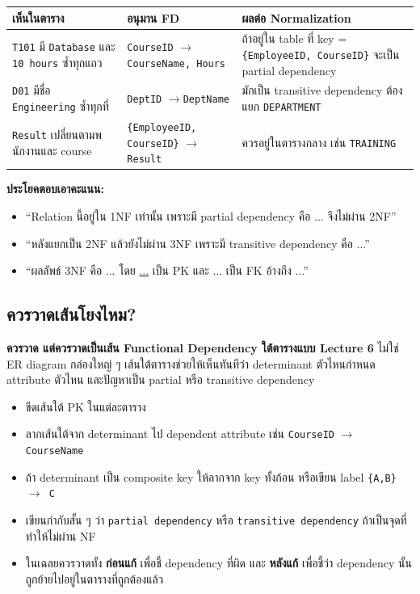 \documentclass[a4paper,12pt]{article}
\newcommand{\pk}[1]{\uline{#1}}
\newcommand{\fd}{\(\rightarrow\)}
\newcommand{\schema}[1]{\texttt{#1}}
\begin{document}
\begin{center}
\renewcommand{\arraystretch}{1.2}
\begin{tabular}{|p{4.0cm}|p{4.8cm}|p{5.0cm}|}
    \hline
    \rowcolor{gray!20}
    \textbf{เห็นในตาราง} & \textbf{อนุมาน FD} & \textbf{ผลต่อ Normalization} \\
    \hline
    \schema{T101} มี \schema{Database} และ \schema{10 hours} ซ้ำทุกแถว & \schema{CourseID} \fd \schema{CourseName, Hours} & ถ้าอยู่ใน table ที่ key = \schema{\{EmployeeID, CourseID\}} จะเป็น partial dependency \\
    \hline
    \schema{D01} มีชื่อ \schema{Engineering} ซ้ำทุกที่ & \schema{DeptID} \fd \schema{DeptName} & มักเป็น transitive dependency ต้องแยก \schema{DEPARTMENT} \\
    \hline
    \schema{Result} เปลี่ยนตามพนักงานและ course & \schema{\{EmployeeID, CourseID\}} \fd \schema{Result} & ควรอยู่ในตารางกลาง เช่น \schema{TRAINING} \\
    \hline
\end{tabular}
\end{center}

\noindent\textbf{ประโยคตอบเอาคะแนน:}
\begin{itemize}
    \item ``Relation นี้อยู่ใน 1NF เท่านั้น เพราะมี partial dependency คือ ... จึงไม่ผ่าน 2NF''
    \item ``หลังแยกเป็น 2NF แล้วยังไม่ผ่าน 3NF เพราะมี transitive dependency คือ ...''
    \item ``ผลลัพธ์ 3NF คือ ... โดย \pk{...} เป็น PK และ ... เป็น FK อ้างถึง ...''
\end{itemize}

\subsection*{ควรวาดเส้นโยงไหม?}
\textbf{ควรวาด แต่ควรวาดเป็นเส้น Functional Dependency ใต้ตารางแบบ Lecture 6} ไม่ใช่ ER diagram กล่องใหญ่ ๆ เส้นใต้ตารางช่วยให้เห็นทันทีว่า determinant ตัวไหนกำหนด attribute ตัวไหน และปัญหาเป็น partial หรือ transitive dependency
\begin{itemize}
    \item ขีดเส้นใต้ PK ในแต่ละตาราง
    \item ลากเส้นใต้จาก determinant ไป dependent attribute เช่น \schema{CourseID} $\rightarrow$ \schema{CourseName}
    \item ถ้า determinant เป็น composite key ให้ลากจาก key ทั้งก้อน หรือเขียน label \schema{\{A,B\} $\rightarrow$ C}
    \item เขียนกำกับสั้น ๆ ว่า \schema{partial dependency} หรือ \schema{transitive dependency} ถ้าเป็นจุดที่ทำให้ไม่ผ่าน NF
    \item ในเฉลยควรวาดทั้ง \textbf{ก่อนแก้} เพื่อชี้ dependency ที่ผิด และ \textbf{หลังแก้} เพื่อชี้ว่า dependency นั้นถูกย้ายไปอยู่ในตารางที่ถูกต้องแล้ว
\end{itemize}
\end{document}
